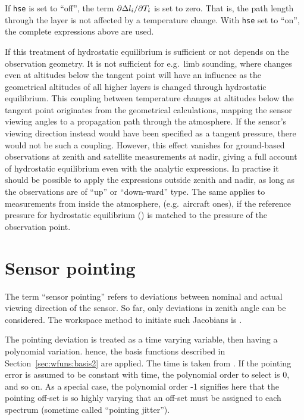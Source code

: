 If \verb|hse| is set to ``off'', the term $\partial \Delta l_{i}/\partial
T_{i}$ is set to zero. That is, the path length through the layer is not
affected by a temperature change. With \verb|hse| set to ``on'', the complete
expressions above are used.

If this treatment of hydrostatic equilibrium is sufficient or not depends on
the observation geometry. It is not sufficient for e.g.\ limb sounding, where
changes even at altitudes below the tangent point will have an influence as the
geometrical altitudes of all higher layers is changed through hydrostatic
equilibrium. This coupling between temperature changes at altitudes below the
tangent point originates from the geometrical calculations, mapping the sensor
viewing angles to a propagation path through the atmosphere. If the sensor's
viewing direction instead would have been specified as a tangent pressure, there
would not be such a coupling. However, this effect vanishes for ground-based
observations at zenith and satellite measurements at nadir, giving a full
account of hydrostatic equilibrium even with the analytic expressions. In
practise it should be possible to apply the expressions outside zenith and
nadir, as long as the observations are of ``up'' or ``down-ward'' type. The
same applies to measurements from inside the atmosphere, (e.g.\ aircraft ones),
if the reference pressure for hydrostatic equilibrium ()
is matched to the pressure of the observation point.





\section{Sensor pointing}
\label{sec:wfuns:sensorpointing}

The term ``sensor pointing'' refers to deviations between nominal and
actual viewing direction of the sensor. So far, only deviations in zenith angle
can be considered. The workspace method to initiate such Jacobians is
.

The pointing deviation is treated as a time varying variable, then having a
polynomial variation. hence, the basis functions described in
Section~\ref{sec:wfuns:basis2} are applied. The time is taken from
. If the pointing error is assumed to be constant with
time, the polynomial order to select is 0, and so on. As a special case, the
polynomial order -1 signifies here that the pointing off-set is so highly
varying that an off-set must be assigned to each spectrum
(sometime called ``pointing jitter'').

